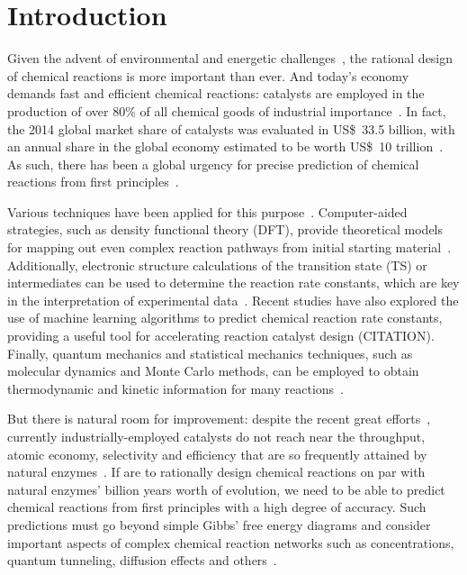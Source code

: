 \chapter{Introduction}%
\label{ch:introduction}


Given the advent of environmental and energetic challenges~\cite{Bertozzi_2016},
the rational design of chemical reactions is more important than ever.
And today's economy demands fast and efficient chemical reactions:
catalysts are employed in the production of over 80\% of all chemical
goods of industrial
importance~\cite{Breakthrough_Catalyst,GlobalCatalystMarket}.
In fact, the 2014 global market share of catalysts was evaluated in US\$~33.5 billion,
with an annual share in the global economy estimated to be worth US\$~10
trillion~\cite{GlobalCatalystMarket}.
As such, there has been a global urgency for precise prediction of chemical reactions from first principles~\cite{Kitchin_2012}.

Various techniques have been applied for this purpose~\cite{Houk_2014,Chin_2022,Cao2022}.
Computer-aided strategies, such as density functional theory (DFT),
provide theoretical models for mapping out even complex reaction pathways from initial starting material~\cite{Maeda_2011,Simm_2017,Rappoport_2019}.
Additionally, electronic structure calculations of the transition state (TS) or intermediates can be used to determine the reaction rate constants,
which are key in the interpretation of experimental data~\cite{Plata_2015,Santoro_2016,Coelho_2019,Oliveira_2020}.
Recent studies have also explored the use of machine learning algorithms
to predict chemical reaction rate constants, providing a useful tool for
accelerating reaction catalyst design (CITATION).
Finally, quantum mechanics and statistical mechanics techniques,
such as molecular dynamics and Monte Carlo methods,
can be employed to obtain thermodynamic and kinetic information for many reactions~\cite{Wang_2014}.

But there is natural room for improvement:
despite the recent great efforts~\cite{Peng_2016}, currently industrially-employed catalysts do
not reach near the throughput, atomic economy, selectivity and efficiency that
are so frequently attained by natural
enzymes~\cite{Catalysis_in_Chemistry_and_Enzymology}.
If are to rationally design chemical reactions on par with natural enzymes' billion years worth of evolution,
we need to be able to predict chemical reactions from first principles with a
high degree of accuracy.
Such predictions must go beyond simple Gibbs' free energy
diagrams and consider important aspects of complex chemical reaction networks
such as concentrations, quantum tunneling, diffusion effects and others~\cite{Besora_2018}.

